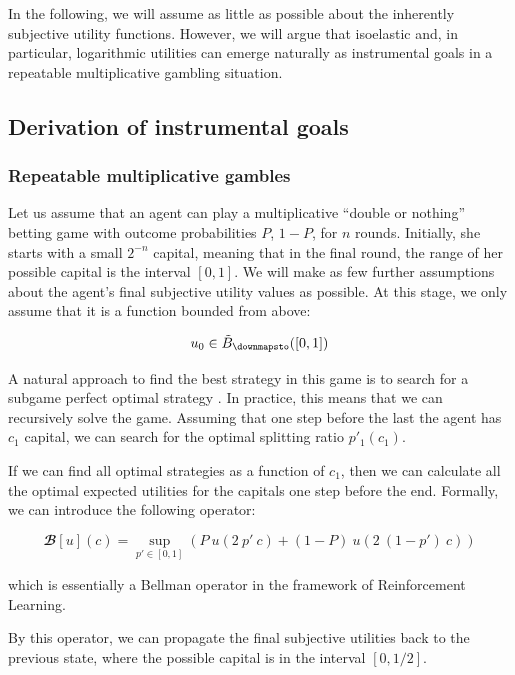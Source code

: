 \documentclass{article}
\theoremstyle{definition}
\begin{document}
In the following, we will assume as little as possible about the inherently subjective utility functions. However, we will argue that isoelastic and, in particular, logarithmic utilities can emerge naturally as instrumental goals in a repeatable multiplicative gambling situation.

\subsection{Derivation of instrumental goals}

\subsubsection{Repeatable multiplicative gambles}

Let us assume that an agent can play a multiplicative ``double or nothing'' betting game with outcome probabilities $P$, $1-P$, for $n$ rounds.
Initially, she starts with a small $2^{-n}$ capital, meaning that in the final round, the range of her possible capital is the interval $[0,1]$.
We will make as few further assumptions about the agent's final subjective utility values as possible. At this stage, we only assume that it is a function bounded from above:

\begin{equation}
    u_0 \in \tilde{B}_\downmapsto([0,1])
\end{equation}

A natural approach to find the best strategy in this game is to search for a subgame perfect optimal strategy \cite{book:GameTheory}.
In practice, this means that we can recursively solve the
game. 
Assuming that one step before the last the agent has $c_1$ capital, we can search for the optimal splitting ratio $p'_1(c_1)$.

If we can find all optimal strategies as a function of $c_1$, then we can calculate all the optimal expected utilities for the capitals one step before the end.
Formally, we can introduce the following operator:

\begin{equation}
    \mathbfcal{B}[u](c) = \sup_{p' \in [0,1]} \left ( P \ u(2 \ p' \ c) + (1-P) \ u(2 \ (1-p') \ c) \right )
\end{equation}

which is essentially a Bellman operator \cite{book:RL} in the framework of Reinforcement Learning.

By this operator, we can propagate the final subjective utilities back to the previous state, where the possible capital is in the interval $[0,1/2]$.
\end{document}
